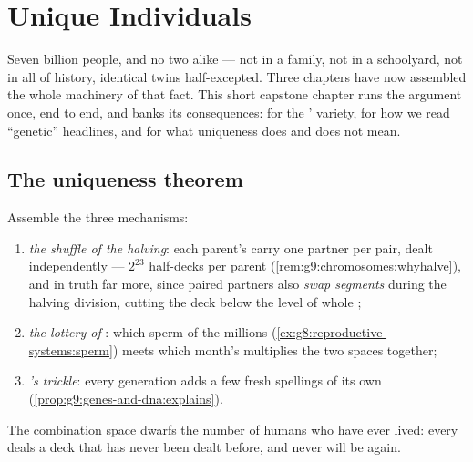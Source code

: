 \chapter{Unique Individuals}\label{ch:g9:unique-individuals}

Seven billion people, and no two alike --- not in a family,
not in a schoolyard, not in all of history, identical twins
half-excepted. Three chapters have now assembled the whole
machinery of that fact. This short capstone chapter runs the
argument once, end to end, and banks its consequences: for
the ' variety, for how we read ``genetic''
headlines, and for what uniqueness does and does not mean.

\section{The uniqueness theorem}

\begin{proposition}\label{prop:g9:unique-individuals:theorem}
Assemble the three mechanisms:
\begin{enumerate}
  \item \emph{the shuffle of the halving}: each parent's
         carry one partner per pair, dealt
        independently --- $2^{23}$ half-decks per parent
        (\cref{rem:g9:chromosomes:whyhalve}), and in truth
        far more, since paired partners also \emph{swap
        segments} during the halving division, cutting the
        deck below the level of whole ;
  \item \emph{the lottery of }: which sperm
        of the millions (\cref{ex:g8:reproductive-systems:sperm})
        meets which month's  multiplies the two spaces
        together;
  \item \emph{'s trickle}: every generation adds a
        few fresh spellings of its own
        (\cref{prop:g9:genes-and-dna:explains}).
\end{enumerate}
The combination space dwarfs the number of humans who have
ever lived: every  deals a deck that has
never been dealt before, and never will be again.
\end{proposition}
\admitted

